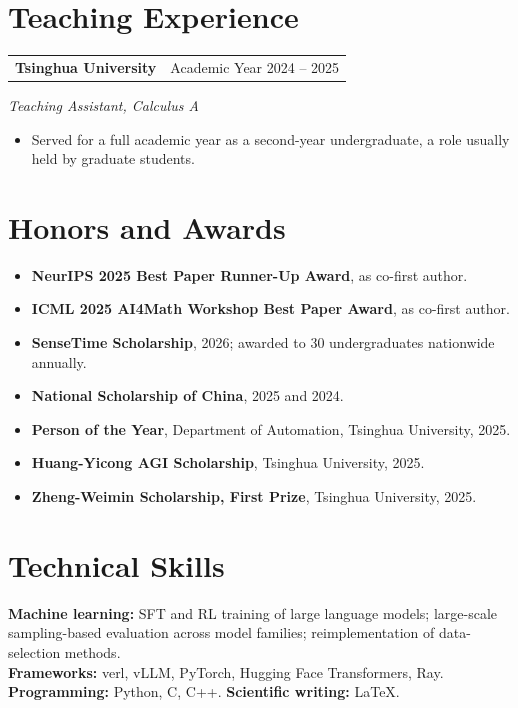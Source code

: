 \documentclass[11pt,letterpaper]{article}
\makeatletter
\newcommand{\headerrow}[2]{%
    \begin{tabular*}{\linewidth}{@{}l@{\extracolsep{\fill}}r@{}}
        #1 & #2 \\
    \end{tabular*}\par
}
\makeatother
\begin{document}
\section*{Teaching Experience}

\headerrow{\textbf{Tsinghua University}}{Academic Year 2024 -- 2025}
\textit{Teaching Assistant, Calculus A}
\begin{itemize}
    \item Served for a full academic year as a second-year undergraduate, a role usually held by graduate students.
\end{itemize}

\section*{Honors and Awards}

\begin{itemize}
    \item \textbf{NeurIPS 2025 Best Paper Runner-Up Award}, as co-first author.
    \item \textbf{ICML 2025 AI4Math Workshop Best Paper Award}, as co-first author.
    \item \textbf{SenseTime Scholarship}, 2026; awarded to 30 undergraduates nationwide annually.
    \item \textbf{National Scholarship of China}, 2025 and 2024.
    \item \textbf{Person of the Year}, Department of Automation, Tsinghua University, 2025.
    \item \textbf{Huang-Yicong AGI Scholarship}, Tsinghua University, 2025.
    \item \textbf{Zheng-Weimin Scholarship, First Prize}, Tsinghua University, 2025.
\end{itemize}

\section*{Technical Skills}

\textbf{Machine learning:} SFT and RL training of large language models; large-scale sampling-based evaluation across model families; reimplementation of data-selection methods.\\
\textbf{Frameworks:} verl, vLLM, PyTorch, Hugging Face Transformers, Ray.\\
\textbf{Programming:} Python, C, C++. \quad \textbf{Scientific writing:} \LaTeX.


\end{document}
